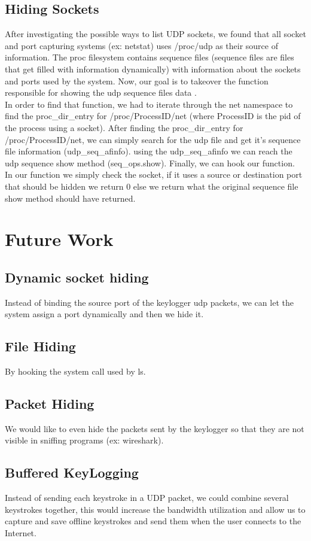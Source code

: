\documentclass{article}
\begin{document}
\subsection{Hiding Sockets}
After investigating the possible ways to list UDP sockets, we found that all socket and port capturing systems (ex: netstat) uses /proc/udp as their source of information. The proc filesystem contains sequence files (sequence files are files that get filled with information dynamically) with information about the sockets and ports used by the system. 
Now, our goal is to takeover the function responsible for showing the udp sequence files data .\\
In order to find that function, we had to iterate through the net namespace to find the proc\_dir\_entry for /proc/ProcessID/net (where ProcessID is the pid of the process using a socket).
After finding the proc\_dir\_entry for /proc/ProcessID/net, we can simply search for the udp file and get it's sequence file information (udp\_seq\_afinfo).
 using the udp\_seq\_afinfo we can reach the udp sequence show method (seq\_ops.show).
Finally, we can hook our function.\\
In our function we simply check the socket, if it uses a source or destination port that should be hidden we return 0 else we return what the original sequence file show method should have returned.
\clearpage
\section{Future Work}
\subsection{Dynamic socket hiding}
Instead of binding the source port of the keylogger udp packets, we can let the system assign a port dynamically and then we hide it.
\subsection{File Hiding}
By hooking the system call used by ls.
\subsection{Packet Hiding}
We would like to even hide the packets sent by the keylogger so that they are not visible in sniffing programs (ex: wireshark).
\subsection{Buffered KeyLogging}
Instead of sending each keystroke in a UDP packet, we could combine several keystrokes together, this would increase the bandwidth utilization and allow us to  capture and save offline keystrokes and send them when the user connects to the Internet.
\end{document}
